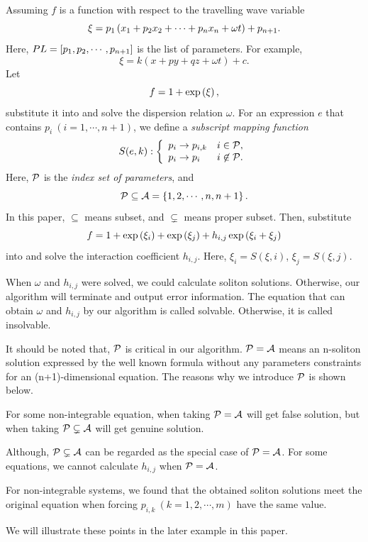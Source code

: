 Assuming $f$ is a function with respect to the travelling wave variable
\begin{equation}
    \xi=p_1\left(x_1+p_2x_2+\cdots+p_nx_n+\omega t\right)+p_{n+1}. \label{tw}
\end{equation}
Here, $PL=\left[p_1,p_2,\cdots,p_{n+1}\right]$ is the list of parameters. For example,  
\begin{equation}
    \xi=k(x+py+qz+\omega t)+c.
\end{equation}
Let
\begin{equation}
    f=1+\exp\left(\xi\right), \label{1-soliton}
\end{equation}
substitute it into  and solve the dispersion relation $\omega$. For an expression $e$ that contains $p_i~(i=1,\cdots,n+1)$, we define a \emph{subscript mapping function}
\begin{equation}
    S(e,k): \left\{\begin{array}{ll}
        p_i \rightarrow p_{i,k} & i \in \mathcal{P}, \\ 
        p_i \rightarrow p_i & i \not\in \mathcal{P}.
    \end{array}\right.
\end{equation}
Here, $\mathcal{P}$ is the \emph{index set of parameters}, and 
\begin{equation}
    \mathcal{P}\subseteq  \mathcal{A}=\left\{1,2,\cdots,n,n+1\right\}.
\end{equation}
In this paper, $\subseteq$ means subset, and $\subsetneq$ means proper subset. Then, substitute
\begin{equation}
    f=1+\exp\left(\xi_i\right)+\exp\left(\xi_j\right)+h_{i,j}\exp\left(\xi_i+\xi_j\right) \label{hij}
\end{equation}
into  and solve the interaction coefficient $h_{i,j}$. Here, $\xi_i=S(\xi,i)$, $\xi_j=S(\xi,j)$.

When $\omega$ and $h_{i,j}$ were solved, we could calculate soliton solutions. Otherwise, our algorithm will terminate and output error information. The equation that can obtain $\omega$ and $h_{i,j}$ by our algorithm is called solvable. Otherwise, it is called insolvable.

It should be noted that, $\mathcal{P}$ is critical in our algorithm. $\mathcal{P}= \mathcal{A}$ means an n-soliton solution expressed by the well known formula without any parameters constraints for an (n+1)-dimensional equation. The reasons why we introduce $\mathcal{P}$ is shown below.
\begin{compactenum}[1. ]
\item For some non-integrable equation, when taking $\mathcal{P}= \mathcal{A}$ will get false solution, but when taking $\mathcal{P}\subsetneq  \mathcal{A}$ will get genuine solution.
\item Although, $\mathcal{P}\subsetneq  \mathcal{A}$ can be regarded as the special case of $\mathcal{P}= \mathcal{A}$. For some equations, we cannot calculate $h_{i,j}$ when $\mathcal{P}= \mathcal{A}$.
\item For non-integrable systems, we found that the obtained soliton solutions meet the original equation when forcing $p_{i,k}~(k=1,2,\cdots,m)$ have the same value.
\end{compactenum}
We will illustrate these points in the later example in this paper.

